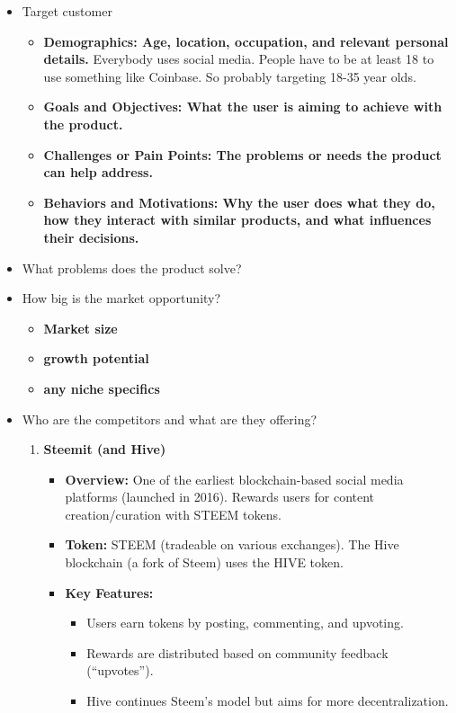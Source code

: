 \documentclass{article}
\begin{document}
\begin{itemize}
    \item Target customer
    \begin{itemize}
        \item {\bf Demographics: Age, location, occupation, and relevant personal details.} Everybody uses social media.  People have to be at least 18 to use something like Coinbase.  So probably targeting 18-35 year olds.
        \item {\bf Goals and Objectives: What the user is aiming to achieve with the product.} 
        \item {\bf Challenges or Pain Points: The problems or needs the product can help address.}
        \item {\bf Behaviors and Motivations: Why the user does what they do, how they interact with similar products, and what influences their decisions.}
    \end{itemize}
    \item What problems does the product solve?
    \item How big is the market opportunity?
    \begin{itemize}
        \item {\bf Market size}
        \item {\bf growth potential}
        \item {\bf any niche specifics}
    \end{itemize}
    \item Who are the competitors and what are they offering?
    \begin{enumerate}

        \item \textbf{Steemit (and Hive)}
          \begin{itemize}
            \item \textbf{Overview:} One of the earliest blockchain-based social media platforms (launched in 2016). Rewards users for content creation/curation with STEEM tokens.
            \item \textbf{Token:} STEEM (tradeable on various exchanges). The Hive blockchain (a fork of Steem) uses the HIVE token.
            \item \textbf{Key Features:}
              \begin{itemize}
                \item Users earn tokens by posting, commenting, and upvoting.
                \item Rewards are distributed based on community feedback (``upvotes'').
                \item Hive continues Steem's model but aims for more decentralization.
              \end{itemize}
          \end{itemize}
  

\end{enumerate}
\end{itemize}
\end{document}
